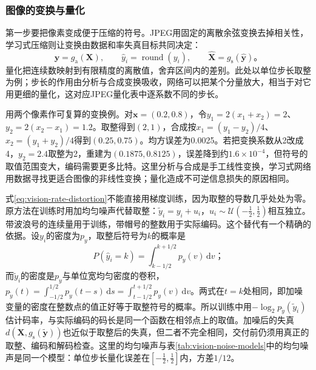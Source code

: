 \subsubsection{图像的变换与量化}
\label{sec:vision-restoration-quantization}

第一步要把像素变成便于压缩的符号。JPEG用固定的离散余弦变换去掉相关性，学习式压缩则让变换由数据和率失真目标共同决定：
\begin{equation}
 \bm{y}=g_{\mathrm{a}}(\bm{X}),\qquad
 \hat y_i=\operatorname{round}(y_i),\qquad
 \widehat{\bm{X}}=g_{\mathrm{s}}(\hat{\bm{y}})\text{。}
 \label{eq:vision-transform-coding}
\end{equation}
量化把连续数映射到有限精度的离散值，舍弃区间内的差别。此处以单位步长取整为例；步长的作用由分析与合成变换吸收，网络可以把某个分量放大，相当于对它用更细的量化，这对应JPEG量化表中逐系数不同的步长。

用两个像素作可复算的变换例。对$\bm{x}=(0.2,0.8)$，令$y_1=2(x_1+x_2)=2$、$y_2=2(x_2-x_1)=1.2$。取整得到$(2,1)$，合成按$x_1=(y_1-y_2)/4$、$x_2=(y_1+y_2)/4$得到$(0.25,0.75)$。均方误差为0.0025。若把变换系数从2改成4，$y_2=2.4$取整为2，重建为$(0.1875,0.8125)$，误差降到约$1.6\times10^{-4}$，但符号的取值范围变大，编码需要更多比特。这里分析与合成是手工线性变换，学习式网络用数据寻找更适合图像的非线性变换；量化造成不可逆信息损失的原因相同。

式\eqref{eq:vision-rate-distortion}不能直接用梯度训练，因为取整的导数几乎处处为零。原方法在训练时用加均匀噪声代替取整：$\tilde y_i=y_i+u_i$，$u_i\sim\mathcal{U}(-\tfrac12,\tfrac12)$相互独立。带波浪号的连续量用于训练，带帽号的整数用于实际编码。这个替代有一个精确的依据。设$y_i$的密度为$p_{y}$，取整后符号为$k$的概率是
\[
 P(\hat y_i=k)=\int_{k-1/2}^{k+1/2}p_{y}(v)\,\mathrm{d}v\text{；}
\]
而$\tilde y_i$的密度是$p_y$与单位宽均匀密度的卷积，$p_{\tilde y}(t)=\int_{-1/2}^{1/2}p_y(t-s)\,\mathrm{d}s=\int_{t-1/2}^{t+1/2}p_y(v)\,\mathrm{d}v$。两式在$t=k$处相同，即加噪变量的密度在整数点的值正好等于取整符号的概率。所以训练中用$-\log_2p_{\tilde y}(\tilde y_i)$估计码率，与实际编码的码长是同一个函数在相邻点上的取值。加噪后的失真$d(\bm{X},g_{\mathrm{s}}(\tilde{\bm{y}}))$也近似于取整后的失真，但二者不完全相同，交付前仍须用真正的取整、编码和解码检查。这里的均匀噪声与表\ref{tab:vision-noise-models}中的均匀噪声是同一个模型：单位步长量化误差在$[-\tfrac12,\tfrac12]$内，方差$1/12$。

